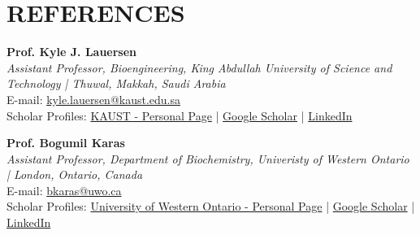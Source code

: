 \documentclass[a4paper,9pt]{extarticle}
\begin{document}


\section*{REFERENCES}
\begin{minipage}{1\textwidth}
\setlength{\parindent}{15pt} %
	\noindent
	\textbf{Prof. Kyle J. Lauersen}\\
	\textit{Assistant Professor, Bioengineering, King Abdullah University of Science and Technology | Thuwal, Makkah, Saudi Arabia}\\
	E-mail: \href{mailto:kyle.lauersen@kaust.edu.sa}{kyle.lauersen@kaust.edu.sa}\\
	Scholar Profiles: \href{https://www.kaust.edu.sa/en/study/faculty/kyle-j-lauersen}{KAUST - Personal Page} | \href{https://scholar.google.com/citations?user=IvP8gI8AAAAJ&hl=en}{Google Scholar} | \href{https://www.linkedin.com/in/kylejlauersen/}{LinkedIn}\\
	\end{minipage}
\begin{minipage}{1\textwidth}
\setlength{\parindent}{15pt} %
	\noindent
	\textbf{Prof. Bogumil Karas}\\
	\textit{Assistant Professor, Department of Biochemistry, Univeristy of Western Ontario | London, Ontario, Canada}\\
	E-mail: \href{mailto:bkaras@uwo.ca}{bkaras@uwo.ca}\\
	Scholar Profiles: \href{https://www.schulich.uwo.ca/biochem//people/faculty/Karas.html}{University of Western Ontario - Personal Page} | \href{https://scholar.google.com/citations?user=b58zresAAAAJ&hl=en}{Google Scholar} | \href{https://www.linkedin.com/in/bogumil-j-karas-77222913/}{LinkedIn}\\ 
\end{minipage}
\end{document}

